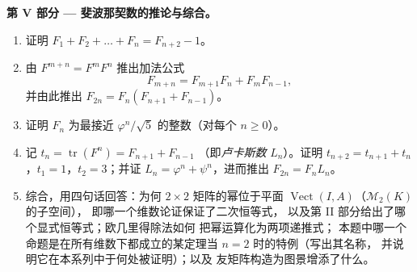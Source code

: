 \begin{problem}
\medskip
\noindent\textbf{第 V 部分 --- 斐波那契数的推论与综合。}
\begin{enumerate}[resume]
  \item 证明 $F_1 + F_2 + \dots + F_n = F_{n+2} - 1$。
  \item 由 $F^{m+n} = F^m F^n$ 推出加法公式
        \[
        F_{m+n} = F_{m+1}F_n + F_m F_{n-1},
        \]
        并由此推出 $F_{2n} = F_n(F_{n+1} + F_{n-1})$。
  \item 证明 $F_n$ 为最接近
        $\varphi^n/\sqrt5$ 的整数（对每个 $n \geq 0$）。
  \item 记 $t_n = \operatorname{tr}(F^n) = F_{n+1} + F_{n-1}$
        （即\emph{卢卡斯数} $L_n$）。证明 $t_{n+2} =
        t_{n+1} + t_n$，$t_1 = 1$，$t_2 = 3$；并证 $L_n =
        \varphi^n + \psi^n$，进而推出 $F_{2n} = F_n L_n$。
  \item 综合，用四句话回答：为何 $2
        \times 2$ 矩阵的幂位于平面
        $\operatorname{Vect}(I, A)$（$\mathcal{M}_2(K)$ 的子空间），
        即哪一个维数论证保证了二次恒等式，
        以及第 II 部分给出了哪个显式恒等式；欧几里得除法如何
        把幂运算化为两项递推式；
        本题中哪一个命题是在所有维数下都成立的某定理当 $n =
        2$ 时的特例（写出其名称，
        并说明它在本系列中于何处被证明）；以及
        友矩阵构造为图景增添了什么。
\end{enumerate}
\end{problem}
